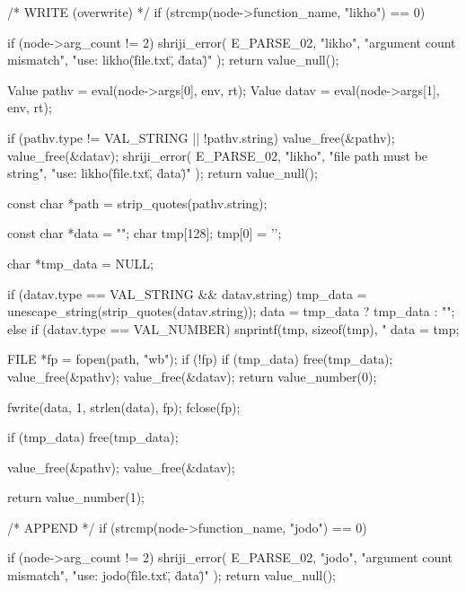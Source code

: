 \documentclass{article}
\begin{document}
{{{    /* WRITE (overwrite) */
    if (strcmp(node->function_name, "likho") == 0) {

        if (node->arg_count != 2) {
            shriji_error(
                E_PARSE_02,
                "likho",
                "argument count mismatch",
                "use: likho(\"file.txt\", \"data\")"
            );
            return value_null();
        }

        Value pathv = eval(node->args[0], env, rt);
        Value datav = eval(node->args[1], env, rt);

        if (pathv.type != VAL_STRING || !pathv.string) {
            value_free(&pathv);
            value_free(&datav);
            shriji_error(
                E_PARSE_02,
                "likho",
                "file path must be string",
                "use: likho(\"file.txt\", \"data\")"
            );
            return value_null();
        }

        const char *path = strip_quotes(pathv.string);

        const char *data = "";
        char tmp[128];
        tmp[0] = '\0';

        char *tmp_data = NULL;

        if (datav.type == VAL_STRING && datav.string) {
            tmp_data = unescape_string(strip_quotes(datav.string));
            data = tmp_data ? tmp_data : "";
        } else if (datav.type == VAL_NUMBER) {
            snprintf(tmp, sizeof(tmp), "%
            data = tmp;
        }

        FILE *fp = fopen(path, "wb");
        if (!fp) {
            if (tmp_data) free(tmp_data);
            value_free(&pathv);
            value_free(&datav);
            return value_number(0);
        }

        fwrite(data, 1, strlen(data), fp);
        fclose(fp);

        if (tmp_data) free(tmp_data);

        value_free(&pathv);
        value_free(&datav);

        return value_number(1);
    }

    /* APPEND */
    if (strcmp(node->function_name, "jodo") == 0) {

        if (node->arg_count != 2) {
            shriji_error(
                E_PARSE_02,
                "jodo",
                "argument count mismatch",
                "use: jodo(\"file.txt\", \"data\")"
            );
            return value_null();
        }

}}}}
\end{document}
